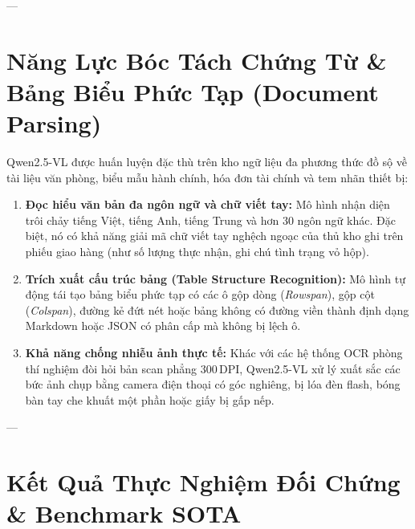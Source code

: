 \documentclass[11pt,a4paper]{article}
\begin{document}
---

\section{Năng Lực Bóc Tách Chứng Từ \& Bảng Biểu Phức Tạp (Document Parsing)}

Qwen2.5-VL được huấn luyện đặc thù trên kho ngữ liệu đa phương thức đồ sộ về tài liệu văn phòng, biểu mẫu hành chính, hóa đơn tài chính và tem nhãn thiết bị:

\begin{enumerate}[leftmargin=1.8em]
    \item \textbf{Đọc hiểu văn bản đa ngôn ngữ và chữ viết tay:} Mô hình nhận diện trôi chảy tiếng Việt, tiếng Anh, tiếng Trung và hơn 30 ngôn ngữ khác. Đặc biệt, nó có khả năng giải mã chữ viết tay nghệch ngoạc của thủ kho ghi trên phiếu giao hàng (như số lượng thực nhận, ghi chú tình trạng vỏ hộp).
    \item \textbf{Trích xuất cấu trúc bảng (Table Structure Recognition):} Mô hình tự động tái tạo bảng biểu phức tạp có các ô gộp dòng (\textit{Rowspan}), gộp cột (\textit{Colspan}), đường kẻ đứt nét hoặc bảng không có đường viền thành định dạng Markdown hoặc JSON có phân cấp mà không bị lệch ô.
    \item \textbf{Khả năng chống nhiễu ảnh thực tế:} Khác với các hệ thống OCR phòng thí nghiệm đòi hỏi bản scan phẳng $300\,\text{DPI}$, Qwen2.5-VL xử lý xuất sắc các bức ảnh chụp bằng camera điện thoại có góc nghiêng, bị lóa đèn flash, bóng bàn tay che khuất một phần hoặc giấy bị gấp nếp.
\end{enumerate}

---

\section{Kết Quả Thực Nghiệm Đối Chứng \& Benchmark SOTA}
\end{document}
